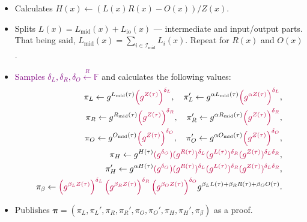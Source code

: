 \documentclass[../lecture-notes-148x210.tex]{subfiles}
\begin{document}
\begin{tcolorbox}
\begin{itemize}[label=]
        \item Calculates $H(x) \gets (L(x)R(x) - O(x))\big/ Z(x)$.
        \item Splits $L(x) = L_{\text{mid}}(x) + L_{\text{io}}(x)$ --- intermediate and input/output parts. That being said, $L_{\text{mid}}(x) = \sum_{i \in \mathcal{I}_{\text{mid}}}L_i(x)$. Repeat for $R(x)$ and $O(x)$.
        \item \textcolor{purple}{Samples $\delta_L, \delta_R, \delta_O \xleftarrow{R} \mathbb{F}$} and calculates the following values: 
        \begin{align*}
            \pi_L \gets g^{L_{\text{mid}}(\tau)}\textcolor{purple}{\left(g^{Z(\tau)}\right)^{\delta_L}}, \quad \pi_L' \gets g^{\alpha L_{\text{mid}}(\tau)}\textcolor{purple}{\left(g^{\alpha Z(\tau)}\right)^{\delta_L}}, \\
            \pi_R \gets g^{R_{\text{mid}}(\tau)}\textcolor{purple}{\left(g^{Z(\tau)}\right)^{\delta_R}}, \quad \pi_R' \gets g^{\alpha R_{\text{mid}}(\tau)}\textcolor{purple}{\left(g^{Z(\tau)}\right)^{\delta_R}}, \\
            \pi_O \gets g^{O_{\text{mid}}(\tau)}\textcolor{purple}{\left(g^{Z(\tau)}\right)^{\delta_O}}, \quad \pi_O' \gets g^{\alpha O_{\text{mid}}(\tau)}\textcolor{purple}{\left(g^{Z(\tau)}\right)^{\delta_O}}, \\
            \pi_H \gets g^{H(\tau)}\textcolor{purple}{(g^{\delta_O})(g^{R(\tau)})^{\delta_L}(g^{L(\tau)})^{\delta_R}(g^{Z(\tau)})^{\delta_L\delta_R}}, \\ 
            \pi_H' \gets g^{\alpha H(\tau)}\textcolor{purple}{(g^{\delta_O})(g^{R(\tau)})^{\delta_L}(g^{L(\tau)})^{\delta_R}(g^{Z(\tau)})^{\delta_L\delta_R}}, \\
            \pi_{\beta} \gets \textcolor{purple}{\left(g^{\beta_L Z(\tau)}\right)^{\delta_L}\left(g^{\beta_R Z(\tau)}\right)^{\delta_R}\left(g^{\beta_O Z(\tau)}\right)^{\delta_O}}g^{\beta_LL(\tau) + \beta_RR(\tau) + \beta_OO(\tau)}.
        \end{align*}
        \item Publishes $\boldsymbol{\pi} = (\pi_L,\pi_L',\pi_R,\pi_R',\pi_O,\pi_O',\pi_H,\pi_H',\pi_{\beta})$ as a proof.
    \end{itemize}


\end{tcolorbox}
\end{document}
